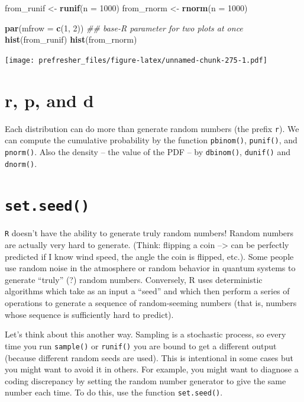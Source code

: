 \documentclass[]{book}
\newenvironment{Shaded}{\begin{snugshade}}{\end{snugshade}}
\newcommand{\CommentTok}[1]{\textcolor[rgb]{0.56,0.35,0.01}{\textit{#1}}}
\newcommand{\DataTypeTok}[1]{\textcolor[rgb]{0.13,0.29,0.53}{#1}}
\newcommand{\DecValTok}[1]{\textcolor[rgb]{0.00,0.00,0.81}{#1}}
\newcommand{\KeywordTok}[1]{\textcolor[rgb]{0.13,0.29,0.53}{\textbf{#1}}}
\newcommand{\NormalTok}[1]{#1}
\newcommand{\StringTok}[1]{\textcolor[rgb]{0.31,0.60,0.02}{#1}}
\theoremstyle{definition}
\theoremstyle{definition}
\theoremstyle{definition}
\theoremstyle{remark}
\begin{document}
\begin{Shaded}
\begin{Highlighting}[]
\NormalTok{from_runif <-}\StringTok{ }\KeywordTok{runif}\NormalTok{(}\DataTypeTok{n =} \DecValTok{1000}\NormalTok{)}
\NormalTok{from_rnorm <-}\StringTok{ }\KeywordTok{rnorm}\NormalTok{(}\DataTypeTok{n =} \DecValTok{1000}\NormalTok{)}

\KeywordTok{par}\NormalTok{(}\DataTypeTok{mfrow =} \KeywordTok{c}\NormalTok{(}\DecValTok{1}\NormalTok{, }\DecValTok{2}\NormalTok{)) }\CommentTok{## base-R parameter for two plots at once}
\KeywordTok{hist}\NormalTok{(from_runif)}
\KeywordTok{hist}\NormalTok{(from_rnorm)}
\end{Highlighting}
\end{Shaded}

\texttt{[image: prefresher\_files/figure-latex/unnamed-chunk-275-1.pdf]}

\hypertarget{r-p-and-d}{%
\section{r, p, and d}\label{r-p-and-d}}

Each distribution can do more than generate random numbers (the prefix \texttt{r}). We can compute the cumulative probability by the function \texttt{pbinom()}, \texttt{punif()}, and \texttt{pnorm()}. Also the density -- the value of the PDF -- by \texttt{dbinom()}, \texttt{dunif()} and \texttt{dnorm()}.

\hypertarget{set.seed}{%
\section{\texorpdfstring{\texttt{set.seed()}}{set.seed()}}\label{set.seed}}

\texttt{R} doesn't have the ability to generate truly random numbers! Random numbers are actually very hard to generate. (Think: flipping a coin --\textgreater{} can be perfectly predicted if I know wind speed, the angle the coin is flipped, etc.). Some people use random noise in the atmosphere or random behavior in quantum systems to generate ``truly'' (?) random numbers. Conversely, R uses deterministic algorithms which take as an input a ``seed'' and which then perform a series of operations to generate a sequence of random-seeming numbers (that is, numbers whose sequence is sufficiently hard to predict).

Let's think about this another way. Sampling is a stochastic process, so every time you run \texttt{sample()} or \texttt{runif()} you are bound to get a different output (because different random seeds are used). This is intentional in some cases but you might want to avoid it in others. For example, you might want to diagnose a coding discrepancy by setting the random number generator to give the same number each time. To do this, use the function \texttt{set.seed()}.
\end{document}
